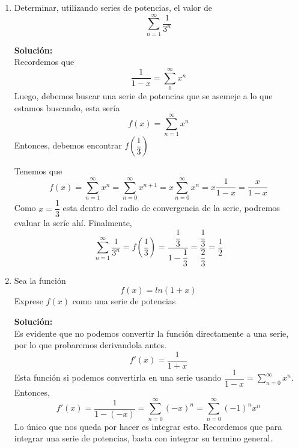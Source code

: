 \documentclass[12pt]{article}
\newenvironment{solucion}
{\begin{mdframed}[backgroundcolor=black!10]
		{\bf Solución:}\\
	}
	{
	\end{mdframed}
}
\newenvironment{preguntas}
{\begin{enumerate}\itemsep12pt
	}
	{
	\end{enumerate}
}
\begin{document}
\begin{preguntas}
\item Determinar, utilizando series de potencias, el valor de
	$$\sum\limits_{n=1}^\infty \frac{1}{3^n}$$
\begin{solucion}
Recordemos que $$\dfrac{1}{1-x} = \sum\limits_0^{\infty} x^n$$
		Luego, debemos buscar una serie de potencias que se asemeje a lo que estamos buscando, esta sería
		$$f(x) = \sum\limits_{n=1}^\infty x^{n}$$
		Entonces, debemos encontrar $f\left(\dfrac{1}{3}\right)$
		
		Tenemos que
		$$f(x) 
		= \sum\limits_{n=1}^\infty x^{n} 
		= \sum\limits_{n=0}^\infty x^{n+1}
		= x\sum\limits_{n=0}^\infty x^{n}
		= x \dfrac{1}{1-x}
		= \dfrac{x}{1-x}$$
		Como $x = \dfrac{1}{3}$ esta dentro del radio de convergencia de la serie, podremos evaluar la seríe ahí. Finalmente,
		$$\sum\limits_{n=1}^\infty \frac{1}{3^n} = f\left(\dfrac{1}{3}\right) = \dfrac{\dfrac{1}{3}}{1-\dfrac{1}{3}}
		= \dfrac{\dfrac{1}{3}}{\dfrac{2}{3}} = \dfrac{1}{2}$$
\end{solucion}
\item Sea la función
	$$f(x) = ln(1+x)$$
	Exprese $f(x)$ como una serie de potencias
\begin{solucion}
Es evidente que no podemos convertir la función directamente a una serie, por lo que probaremos derivandola antes.
		$$f'(x) = \dfrac{1}{1+x}$$
		Esta función si podemos convertirla en una serie usando $\dfrac{1}{1-x} = \sum\limits_{n=0}^{\infty} x^n$. Entonces,
		$$f'(x) = \dfrac{1}{1-(-x)} 
		= \sum\limits_{n=0}^{\infty} (-x)^n
		= \sum\limits_{n=0}^{\infty} (-1)^n x^n$$
		Lo único que nos queda por hacer es integrar esto. Recordemos que para integrar una serie de potencias, basta con integrar su termino general.
		

\end{solucion}
\end{preguntas}
\end{document}
